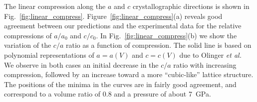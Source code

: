 \documentclass[prb,aps,nobibnotes,twocolumn,doublespace,twocolumngrid,superbib]{revtex4}
\begin{document}

The linear compression along the $a$ and $c$ crystallographic
directions is shown in Fig.~\ref{fig:linear_compress}.
Figure~\ref{fig:linear_compress}(a) reveals good agreement between our
predictions and the experimental data for the relative compressions of
$a/a_0$ and $c/c_0$.
In Fig.~\ref{fig:linear_compress}(b) we show the variation of the
$c/a$ ratio as a function of compression.
The solid line is based on polynomial representations of $a=a(V)$ and
$c=c(V)$ due to Olinger {\it et al.}~\cite{Olinger_1975v62} We observe
in both cases an initial decrease in the $c/a$ ratio with increasing
compression, followed by an increase toward a more ``cubic-like''
lattice structure.  The positions of the minima in the curves are in
fairly good agreement, and correspond to a volume ratio of 0.8 and a
pressure of about 7~GPa.


%
\end{document}
